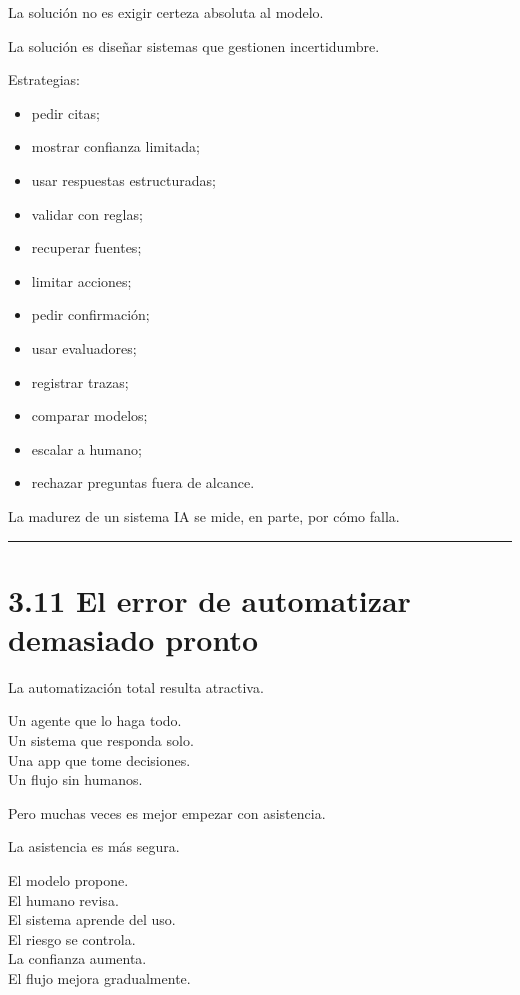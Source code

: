 La solución no es exigir certeza absoluta al modelo.

La solución es diseñar sistemas que gestionen incertidumbre.

Estrategias:

\begin{itemize}
\tightlist
\item
  pedir citas;
\item
  mostrar confianza limitada;
\item
  usar respuestas estructuradas;
\item
  validar con reglas;
\item
  recuperar fuentes;
\item
  limitar acciones;
\item
  pedir confirmación;
\item
  usar evaluadores;
\item
  registrar trazas;
\item
  comparar modelos;
\item
  escalar a humano;
\item
  rechazar preguntas fuera de alcance.
\end{itemize}

La madurez de un sistema IA se mide, en parte, por cómo falla.

\begin{center}\rule{0.5\linewidth}{0.5pt}\end{center}

\section{3.11 El error de automatizar demasiado
pronto}\label{el-error-de-automatizar-demasiado-pronto}

La automatización total resulta atractiva.

Un agente que lo haga todo.\\
Un sistema que responda solo.\\
Una app que tome decisiones.\\
Un flujo sin humanos.

Pero muchas veces es mejor empezar con asistencia.

La asistencia es más segura.

El modelo propone.\\
El humano revisa.\\
El sistema aprende del uso.\\
El riesgo se controla.\\
La confianza aumenta.\\
El flujo mejora gradualmente.

